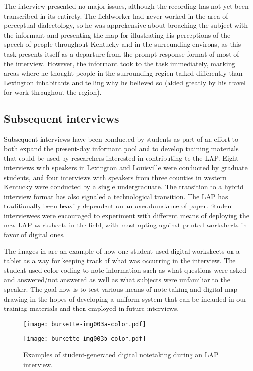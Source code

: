 \documentclass[output=paper]{langscibook}
\begin{document}
The interview presented no major issues, although the recording has not yet been transcribed in its entirety. The fieldworker had never worked in the area of perceptual dialectology, so he was apprehensive about broaching the subject with the informant and presenting the map for illustrating his perceptions of the speech of people throughout Kentucky and in the surrounding environs, as this task presents itself as a departure from the prompt-response format of most of the interview. However, the informant took to the task immediately, marking areas where he thought people in the surrounding region talked differently than Lexington inhabitants and telling why he believed so (aided greatly by his travel for work throughout the region).

\subsection{Subsequent interviews} %
\label{sec:burkette:4.2}
Subsequent interviews have been conducted by students as part of an effort to both expand the present-day informant pool and to develop training materials that could be used by researchers interested in contributing to the LAP. Eight interviews with speakers in Lexington and Louisville were conducted by graduate students, and four interviews with speakers from three counties in western Kentucky were conducted by a single undergraduate. The transition to a hybrid interview format has also signaled a technological transition. The LAP has traditionally been heavily dependent on an overabundance of paper. Student interviewees were encouraged to experiment with different means of deploying the new LAP worksheets in the field, with most opting against printed worksheets in favor of digital ones. 

The images in  are an example of how one student used digital worksheets on a tablet as a way for keeping track of what was occurring in the interview. The student used color coding to note information such as what questions were asked and answered/not answered as well as what subjects were unfamiliar to the speaker. The goal now is to test various means of note-taking and digital map-drawing in the hopes of developing a uniform system that can be included in our training materials and then employed in future interviews.     

\vfill
\begin{figure}[H]
\begin{minipage}{0.5\textwidth}
\texttt{[image: burkette-img003a-color.pdf]}
\end{minipage}%
\begin{minipage}{0.5\textwidth}
\texttt{[image: burkette-img003b-color.pdf]}
\end{minipage}%
\caption{\label{fig:burkette:3}Examples of student-generated digital notetaking during an LAP interview.}
\end{figure}
\vfill\pagebreak
\end{document}
